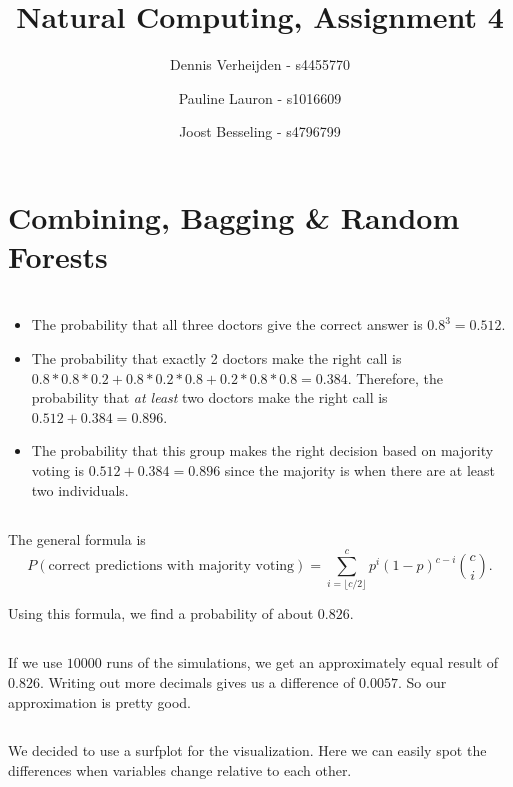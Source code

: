 \documentclass[11pt]{article}
\title{Natural Computing, Assignment 4}
\author{Dennis Verheijden - s4455770 \and Pauline Lauron - s1016609 \and Joost Besseling - s4796799}
\newcommand{\floor}[1]{\lfloor #1 \rfloor}
\begin{document}
\maketitle

\section*{Combining, Bagging \& Random Forests}
\section{}
\subsection{}
\begin{itemize}
	\item 
	The probability that all three doctors give the correct answer is $ 0.8^3 = 0.512$. 
	\item 
	The probability that exactly 2 doctors make the right call is $0.8*0.8*0.2 + 0.8*0.2*0.8 + 0.2*0.8*0.8 = 0.384$. Therefore, the probability that \emph{at least} two doctors make the right call is $0.512 + 0.384 = 0.896$.
	\item  The probability that this group makes the right decision based on majority voting is $0.512 + 0.384 = 0.896$ since the majority is when there are at least two individuals. 
\end{itemize}


\subsection{}
The general formula is 
\[
	P(\text{correct predictions with majority voting}) = \sum_{i = \floor{c/2}}^{c} p^{i} (1-p)^{c-i}  \binom{c}{i}.
\]

Using this formula, we find a probability of about $0.826$.

\subsection{}
If we use $10000$ runs of the simulations, we get an approximately equal result of $0.826$. Writing out more decimals gives us a difference of $0.0057$. So our approximation is pretty good.

\subsection{}
We decided to use a surfplot for the visualization. Here we can easily spot the differences when variables change relative to each other.
\end{document}
